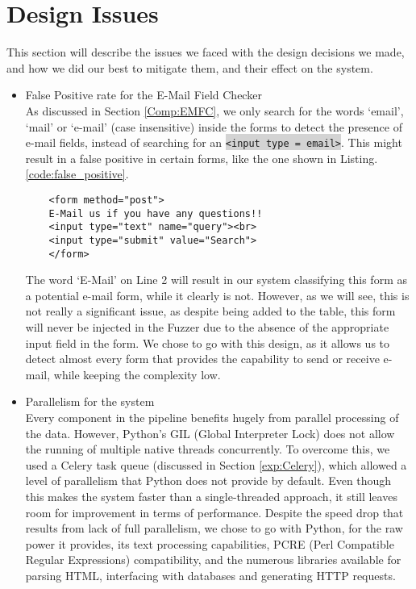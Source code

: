 \section[Issues]{Design Issues}
\label{sys:issues}
This section will describe the issues we faced with the design decisions we made, and how we did our best to mitigate them, and their effect on the system.

\begin{itemize}
	\item \label{issues:fpr}False Positive rate for the E-Mail Field Checker\\
	As discussed in Section \ref{Comp:EMFC}, we only search for the words `email', `mail' or `e-mail' (case insensitive) inside the forms to detect the presence of e-mail fields, instead of searching for an \colorbox{lightgray}{\lstinline{<input type = email>}}. This might result in a false positive in certain forms, like the one shown in Listing. \ref{code:false_positive}.
	
	\begin{lstlisting}
	<form method="post">
	E-Mail us if you have any questions!!
	<input type="text" name="query"><br>
	<input type="submit" value="Search">
	</form>
	\end{lstlisting}
	
	The word `E-Mail' on Line 2 will result in our system classifying this form as a potential e-mail form, while it clearly is not. However, as we will see, this is not really a significant issue, as despite being added to the  table, this form will never be injected in the Fuzzer due to the absence of the appropriate input field in the form. We chose to go with this design, as it allows us to detect almost every form that provides the capability to send or receive e-mail, while keeping the complexity low.
	
	\item Parallelism for the system\\
	\label{issues:parallel}
	Every component in the pipeline benefits hugely from parallel processing of the data. However, Python's GIL (Global Interpreter Lock) does not allow the running of multiple native threads concurrently. To overcome this, we used a Celery task queue (discussed in Section \ref{exp:Celery}), which allowed a level of parallelism that Python does not provide by default. Even though this makes the system faster than a single-threaded approach, it still leaves room for improvement in terms of performance. Despite the speed drop that results from lack of full parallelism, we chose to go with Python, for the raw power it provides, its text processing capabilities, PCRE (Perl Compatible Regular Expressions) compatibility, and the numerous libraries available for parsing HTML, interfacing with databases and generating HTTP requests.
	

\end{itemize}
